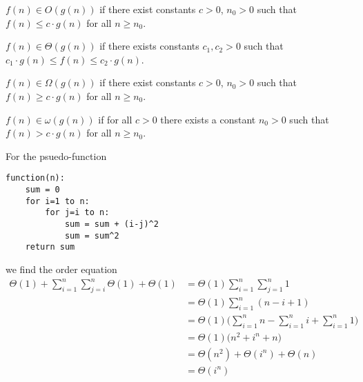 \documentclass[12pt]{article}
\begin{document}
\begin{definition}[$O$]
$f(n) \in O(g(n))$ if there exist constants $c > 0$, $n_0 > 0$ such that $f(n) \leq c \cdot g(n)$ for all $n \geq n_0$.
\end{definition}

\begin{definition}[$\Theta$]
$f(n) \in \Theta(g(n))$ if there exists constants $c_1, c_2 > 0$ such that $c_1 \cdot g(n) \leq f(n) \leq c_2 \cdot g(n)$.
\end{definition}

\begin{definition}[$\Omega$]
$f(n) \in \Omega(g(n))$ if there exist constants $c > 0$, $n_0 > 0$ such that $f(n) \geq c \cdot g(n)$ for all $n \geq n_0$.
\end{definition}

\begin{definition}[$\omega$]
$f(n) \in \omega(g(n))$ if for all $c > 0$ there exists a constant $n_0 > 0$ such that $f(n) > c \cdot g(n)$ for all $n \geq n_0$.
\end{definition}

\begin{example}
For the psuedo-function
\begin{verbatim}
function(n):
    sum = 0
    for i=1 to n:
        for j=i to n:
            sum = sum + (i-j)^2
            sum = sum^2
    return sum
\end{verbatim}
we find the order equation
\begin{align*}
\Theta(1) + \sum_{i=1}^n \sum_{j=i}^n \Theta(1) + \Theta(1) &= \Theta(1) \sum_{i=1}^n \sum_{j=1}^n 1\\
&= \Theta(1) \sum_{i=1}^n (n-i+1)\\
&= \Theta(1) \bigg( \sum_{i=1}^n n - \sum_{i=1}^n i + \sum_{i=1}^n 1 \bigg)\\
&= \Theta(1) \bigl( n^2 + i^n + n \bigl)\\
&= \Theta(n^2) + \Theta(i^n) + \Theta(n)\\
&= \Theta(i^n)
\end{align*}
\end{example}
\end{document}
